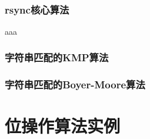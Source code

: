 ﻿\documentclass[a4paper,11pt]{article}
\begin{document}
  \tt %
  \pagestyle{header}
  \sybmaketitle
  \tableofcontents
  \newpage

\pagestyle{main}
\setcounter{page}{1}

\section[rsync核心算法]{rsync核心算法}
aaa





\section[字符串匹配的KMP算法]{字符串匹配的KMP算法}

\section[字符串匹配的Boyer-Moore算法]{字符串匹配的Boyer-Moore算法}


\part[位操作算法实例]{位操作算法实例}


\end{document}
